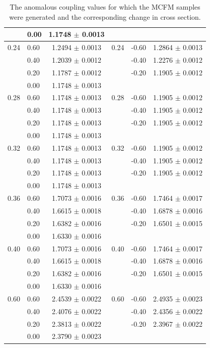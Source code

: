 \begin{table}[h]
\begin{center}
\begin{tabular}{l l c | l l c}
     & 0.00 & 1.1748 $\pm$ 0.0013 &      &       &                     \\ \hline
0.24 & 0.60 & 1.2494 $\pm$ 0.0013 & 0.24 & -0.60 & 1.2864 $\pm$ 0.0013 \\ 
     & 0.40 & 1.2039 $\pm$ 0.0012 &      & -0.40 & 1.2276 $\pm$ 0.0012 \\ 
     & 0.20 & 1.1787 $\pm$ 0.0012 &      & -0.20 & 1.1905 $\pm$ 0.0012 \\ 
     & 0.00 & 1.1748 $\pm$ 0.0013 &      &       &                     \\ \hline
0.28 & 0.60 & 1.1748 $\pm$ 0.0013 & 0.28 & -0.60 & 1.1905 $\pm$ 0.0012 \\ 
     & 0.40 & 1.1748 $\pm$ 0.0013 &      & -0.40 & 1.1905 $\pm$ 0.0012 \\ 
     & 0.20 & 1.1748 $\pm$ 0.0013 &      & -0.20 & 1.1905 $\pm$ 0.0012 \\ 
     & 0.00 & 1.1748 $\pm$ 0.0013 &      &       &                     \\ \hline
0.32 & 0.60 & 1.1748 $\pm$ 0.0013 & 0.32 & -0.60 & 1.1905 $\pm$ 0.0012 \\ 
     & 0.40 & 1.1748 $\pm$ 0.0013 &      & -0.40 & 1.1905 $\pm$ 0.0012 \\ 
     & 0.20 & 1.1748 $\pm$ 0.0013 &      & -0.20 & 1.1905 $\pm$ 0.0012 \\ 
     & 0.00 & 1.1748 $\pm$ 0.0013 &      &       &                     \\ \hline
0.36 & 0.60 & 1.7073 $\pm$ 0.0016 & 0.36 & -0.60 & 1.7464 $\pm$ 0.0017 \\ 
     & 0.40 & 1.6615 $\pm$ 0.0018 &      & -0.40 & 1.6878 $\pm$ 0.0016 \\ 
     & 0.20 & 1.6382 $\pm$ 0.0016 &      & -0.20 & 1.6501 $\pm$ 0.0015 \\ 
     & 0.00 & 1.6330 $\pm$ 0.0016 &      &       &                     \\ \hline
0.40 & 0.60 & 1.7073 $\pm$ 0.0016 & 0.40 & -0.60 & 1.7464 $\pm$ 0.0017 \\ 
     & 0.40 & 1.6615 $\pm$ 0.0018 &      & -0.40 & 1.6878 $\pm$ 0.0016 \\ 
     & 0.20 & 1.6382 $\pm$ 0.0016 &      & -0.20 & 1.6501 $\pm$ 0.0015 \\ 
     & 0.00 & 1.6330 $\pm$ 0.0016 &      &       &                     \\ \hline  
0.60 & 0.60 & 2.4539 $\pm$ 0.0022 & 0.60 & -0.60 & 2.4935 $\pm$ 0.0023 \\ 
     & 0.40 & 2.4076 $\pm$ 0.0022 &      & -0.40 & 2.4356 $\pm$ 0.0022 \\ 
     & 0.20 & 2.3813 $\pm$ 0.0022 &      & -0.20 & 2.3967 $\pm$ 0.0022 \\ 
     & 0.00 & 2.3790 $\pm$ 0.0023 &      &                            \\ \hline  
    \hline  
\end{tabular}
\end{center}
\caption{\label{tab:aTGC_generatedPoints2}
The anomalous coupling values for which the MCFM samples were generated and the corresponding 
change in cross section.}
\end{table}
